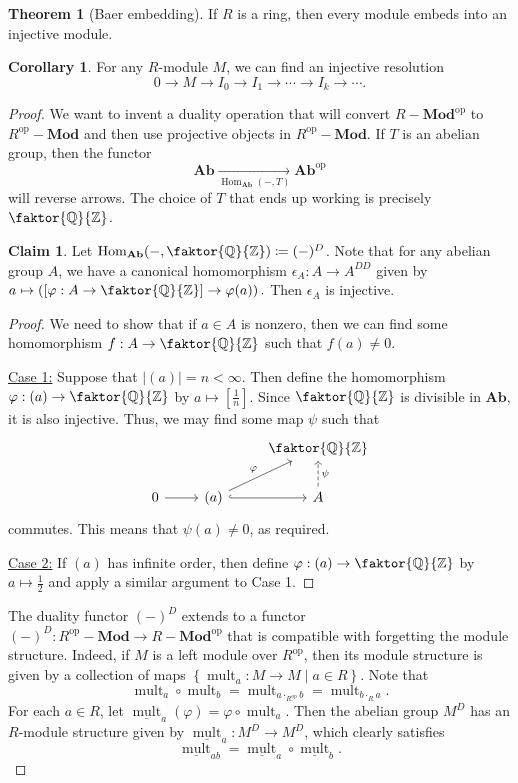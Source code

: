 \documentclass[10pt,letterpaper,cm]{nupset}
\theoremstyle{definition}
\theoremstyle{theorem}
\newtheorem{theorem}[definition]{Theorem}
\newtheorem{corollary}[definition]{Corollary}
\newtheorem*{claim}{Claim}
\theoremstyle{remark}
\newcommand{\Q}{\mathbb Q}
\newcommand{\Z}{\mathbb Z}
\newcommand{\1}{\mathbf{1}}
\newcommand{\0}{\vec 0}
\DeclareMathOperator{\op}{op}
\DeclareMathOperator{\Hom}{Hom}
\DeclareMathOperator{\mult}{mult}
\begin{document}
\begin{theorem}[Baer embedding]
If $R$ is a ring, then every module embeds into an injective module.
\begin{corollary}
For any $R$-module $M$, we can find an injective resolution $$ 0 \to M \to I_0 \to I_1 \to \cdots \to I_k \to \cdots  . $$
\end{corollary} 
\end{theorem}
\begin{proof}
We want to invent a duality operation that will convert $R {-} \mathbf{Mod}^{\op}$ to  $R^{\op} {-} \mathbf{Mod}$ and then use projective objects in $R^{\op}{-}\mathbf{Mod}$. If $T$ is an abelian group, then the functor $$ \mathbf{Ab}\underset{\Hom_{\mathbf{Ab}}(-, T)}{ \longrightarrow} \mathbf{Ab}^{\op}$$ will reverse arrows. The choice of $T$ that ends up working is precisely $\faktor{\Q}{\Z}$.
\begin{claim}
Let $\Hom_{\mathbf{Ab}}(-, \faktor{\Q}{\Z}) \coloneqq  (-)^D$. Note that for any abelian group $A$, we have a canonical homomorphism $\epsilon_A : A \to A^{DD}$ given by $a \mapsto \left(\left[\varphi :A \to \faktor{\Q}{\Z}\right] \to \varphi(a)\right).$ Then $\epsilon_A$ is injective.
\end{claim}
\begin{proof}
We need to show that if $a\in A$ is nonzero, then we can find some homomorphism $f: A \to \faktor{\Q}{\Z}$ such that $f(a) \ne 0$.

\underline{Case 1:} Suppose that $\left\lvert{(a)}\right\rvert = n< \infty$. Then define the homomorphism $\varphi : (a) \to \faktor{\Q}{\Z}$ by $a \mapsto [\frac{1}{n}]$. Since $\faktor{\Q}{\Z}$ is divisible in $\mathbf{Ab}$, it is also injective. Thus, we may find some map  $\psi$ such that 
\[
\begin{tikzcd}
 &  & \faktor{\Q}{\Z} \\
0 \arrow[r] & (a) \arrow[r, hook] \arrow[ru, "\varphi"] & A \arrow[u, "\psi"', dashed]
\end{tikzcd}
\] commutes. This means that $\psi(a) \ne 0$, as required.

\underline{Case 2:} If $(a)$ has infinite order, then define $\varphi : (a) \to \faktor{\Q}{\Z}$ by $a \mapsto \frac{1}{2}$ and apply a similar argument to Case 1.
\end{proof}


The duality functor $(-)^D$ extends to a functor $ (-)^D: R^{\op}{-}\mathbf{Mod} \to R {-}\mathbf{Mod}^{\op}$ that is compatible with forgetting the module structure. Indeed, if $M$ is a left module over $R^{\op}$, then its module structure is given by a collection of maps $\left\{\mult_a : M \to M \mid a\in R\right\}$. Note that $$ \mult_a \circ \mult_b = \mult_{a \cdot_{R^{\op}} b} =  \mult_{b \cdot_{R} a}   .$$ For each $a\in R$, let $\underline{\mult}_a(\varphi) = \varphi \circ {\mult}_a$. Then the abelian group $M^D$ has an $R$-module structure given by $ \underline{\mult}_a: M^D \to M^D$, which clearly satisfies $$\underline{\mult}_{ab} = \underline{\mult}_a \circ\underline{\mult}_b.$$



\end{proof}
\end{document}
